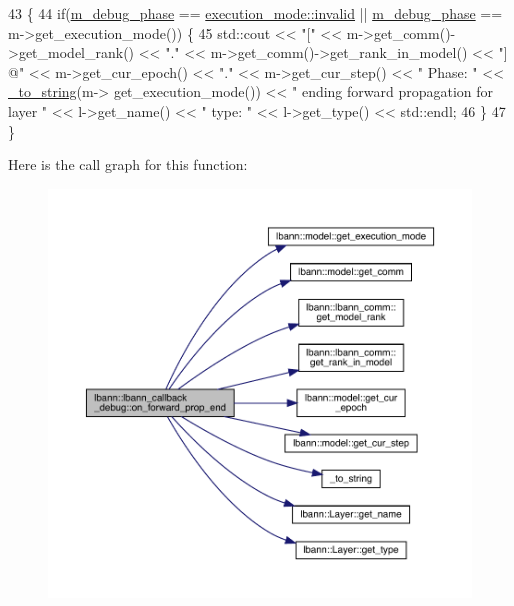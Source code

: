 \begin{DoxyCode}
43                                                                       \{
44   \textcolor{keywordflow}{if}(\hyperlink{classlbann_1_1lbann__callback__debug_acc66ab699534e42aa958148f1fb3fd6f}{m\_debug\_phase} == \hyperlink{base_8hpp_a2781a159088df64ed7d47cc91c4dc0a8afedb2d84cafe20862cb4399751a8a7e3}{execution\_mode::invalid} || 
      \hyperlink{classlbann_1_1lbann__callback__debug_acc66ab699534e42aa958148f1fb3fd6f}{m\_debug\_phase} == m->get\_execution\_mode()) \{
45     std::cout << \textcolor{stringliteral}{"["} << m->get\_comm()->get\_model\_rank() << \textcolor{stringliteral}{"."} << m->get\_comm()->get\_rank\_in\_model() << \textcolor{stringliteral}{"]
       @"} << m->get\_cur\_epoch() << \textcolor{stringliteral}{"."} << m->get\_cur\_step() << \textcolor{stringliteral}{" Phase: "} << \hyperlink{base_8hpp_adeeaddd10bd31df0cae7cb0fcae45d5c}{\_to\_string}(m->
      get\_execution\_mode()) << \textcolor{stringliteral}{"   ending forward propagation for layer "} << l->get\_name() << \textcolor{stringliteral}{" type: "} << l->get\_type() << 
      std::endl;
46   \}
47 \}
\end{DoxyCode}
Here is the call graph for this function\+:\nopagebreak
\begin{figure}[H]
\begin{center}
\leavevmode
\includegraphics[width=350pt]{classlbann_1_1lbann__callback__debug_acb3d05be6c600f4d61957ccf10606ddc_cgraph}
\end{center}
\end{figure}
